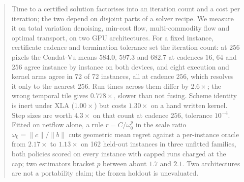 %

\begin{abstract}
Time to a certified solution factorises into an iteration count and a cost per
iteration; the two depend on disjoint parts of a solver recipe. We measure it
on total variation denoising, min-cost flow, multi-commodity flow and optimal
transport, on two GPU architectures. For a fixed instance, certificate cadence
and termination tolerance set the iteration count: at $256$ pixels the
Condat-Vu means $584.0$, $597.3$ and $682.7$ at cadences $16$, $64$ and $256$
agree instance by instance on both devices, and eight execution and kernel
arms agree in 72 of 72 instances, all at cadence $256$, which resolves it only
to the nearest $256$. Run times across them differ by $2.6\times$; the wrong
temporal tile gives $0.778\times$, slower than not fusing. Scheme identity is
inert under XLA ($1.00\times$) but costs $1.30\times$ on a hand written
kernel. Step sizes are worth $4.3\times$ on that count at cadence $256$,
tolerance $10^{-4}$. Fitted on netflow alone, a rule $r = C/\omega_0^p$ in the
scale ratio $\omega_0 = \|c\|/\|b\|$ cuts geometric mean regret against a
per-instance oracle from $2.17\times$ to $1.13\times$ on 162 held-out
instances in three unfitted families, both policies scored on every instance
with capped runs charged at the cap; two estimators bracket $p$ between about
$1.7$ and $2.1$. Two architectures are not a portability claim; the frozen
holdout is unevaluated.
\end{abstract}
